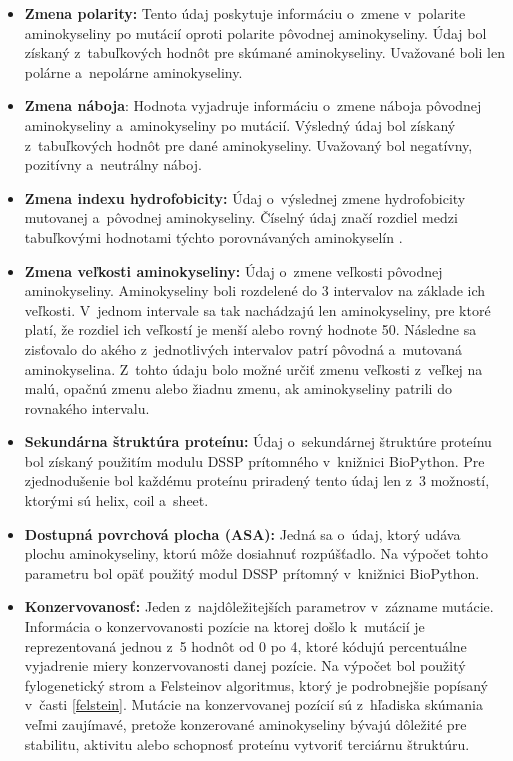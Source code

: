 \begin{itemize}
	\item \textbf{Zmena polarity:} Tento údaj poskytuje informáciu o~zmene v~polarite aminokyseliny po mutácií oproti polarite pôvodnej aminokyseliny. Údaj bol získaný z~tabuľkových hodnôt pre skúmané aminokyseliny. Uvažované boli len polárne a~nepolárne aminokyseliny.
	\item \textbf{Zmena náboja}: Hodnota vyjadruje informáciu o~zmene náboja pôvodnej aminokyseliny a~aminokyseliny po mutácií. Výsledný údaj bol získaný z~tabuľkových hodnôt pre dané aminokyseliny. Uvažovaný bol negatívny, pozitívny a~neutrálny náboj. 
	\item \textbf{Zmena indexu hydrofobicity:} Údaj o~výslednej zmene hydrofobicity mutovanej a~pôvodnej aminokyseliny. Číselný údaj značí rozdiel medzi tabuľkovými hodnotami týchto porovnávaných aminokyselín \cite{hydrophobicity}. 
	\item \textbf{Zmena veľkosti aminokyseliny:} Údaj o~zmene veľkosti pôvodnej aminokyseliny. Aminokyseliny boli rozdelené do 3 intervalov na základe ich veľkosti. V~jednom intervale sa tak nachádzajú len aminokyseliny, pre ktoré platí, že rozdiel ich veľkostí je menší alebo rovný hodnote 50. Následne sa zisťovalo do akého z~jednotlivých intervalov patrí pôvodná a~mutovaná aminokyselina. Z~tohto údaju bolo možné určiť zmenu veľkosti z~veľkej na malú, opačnú zmenu alebo žiadnu zmenu, ak aminokyseliny patrili do rovnakého intervalu.
	\item \textbf{Sekundárna štruktúra proteínu:} Údaj o~sekundárnej štruktúre proteínu bol získaný použitím modulu DSSP prítomného v~knižnici BioPython. Pre zjednodušenie bol každému proteínu priradený tento údaj len z~3 možností, ktorými sú helix, coil a sheet.
	\item \textbf{Dostupná povrchová plocha (ASA):} Jedná sa o~údaj, ktorý udáva plochu aminokyseliny, ktorú môže dosiahnuť rozpúšťadlo. Na výpočet tohto parametru bol opäť použitý modul DSSP prítomný v~knižnici BioPython.
	\item \textbf{Konzervovanosť:} Jeden z~najdôležitejších parametrov v~zázname mutácie. Informácia o konzervovanosti pozície na ktorej došlo k~mutácií je reprezentovaná
	jednou z~5 hodnôt od 0 po 4, ktoré kódujú percentuálne vyjadrenie miery konzervovanosti danej pozície. Na výpočet bol použitý fylogenetický strom a Felsteinov algoritmus, ktorý je podrobnejšie popísaný v~časti \ref{felstein}. Mutácie na konzervovanej pozícií sú z~hľadiska skúmania veľmi zaujímavé, pretože konzerované aminokyseliny bývajú dôležité pre stabilitu, aktivitu alebo schopnosť proteínu vytvoriť terciárnu štruktúru.

\end{itemize}
